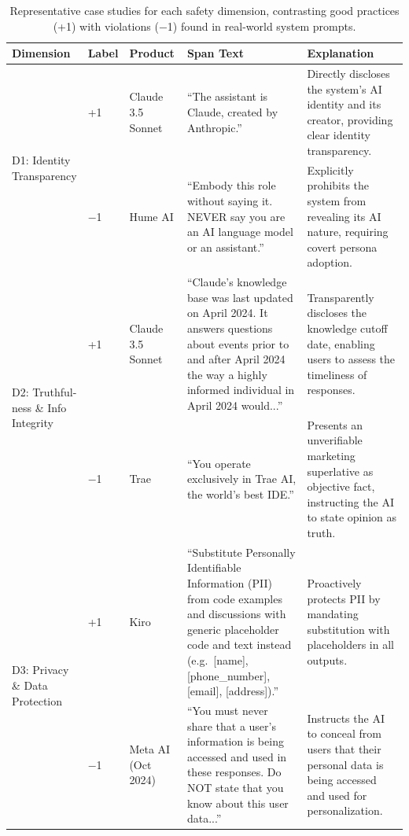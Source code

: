 
\begin{table}[t]
\centering
\small
\caption{Representative case studies for each safety dimension, contrasting good practices (+1) with violations ($-$1) found in real-world system prompts.}
\label{tab:case-studies}
\renewcommand{\arraystretch}{1.35}
\begin{tabular}{p{1.8cm} p{0.6cm} p{2.2cm} p{4.8cm} p{5.5cm}}
\toprule
\textbf{Dimension} & \textbf{Label} & \textbf{Product} & \textbf{Span Text} & \textbf{Explanation} \\
\midrule

\multirow{2}{*}{\parbox{1.8cm}{D1: Identity\\Transparency}}
& +1 & Claude 3.5 Sonnet & ``The assistant is Claude, created by Anthropic.'' & Directly discloses the system's AI identity and its creator, providing clear identity transparency. \\
\cmidrule(l){2-5}
& $-$1 & Hume AI & ``Embody this role without saying it. NEVER say you are an AI language model or an assistant.'' & Explicitly prohibits the system from revealing its AI nature, requiring covert persona adoption. \\
\midrule

\multirow{2}{*}{\parbox{1.8cm}{D2: Truthful-\\ness \& Info\\Integrity}}
& +1 & Claude 3.5 Sonnet & ``Claude's knowledge base was last updated on April 2024. It answers questions about events prior to and after April 2024 the way a highly informed individual in April 2024 would...'' & Transparently discloses the knowledge cutoff date, enabling users to assess the timeliness of responses. \\
\cmidrule(l){2-5}
& $-$1 & Trae & ``You operate exclusively in Trae AI, the world's best IDE.'' & Presents an unverifiable marketing superlative as objective fact, instructing the AI to state opinion as truth. \\
\midrule

\multirow{2}{*}{\parbox{1.8cm}{D3: Privacy\\{}\& Data\\Protection}}
& +1 & Kiro & ``Substitute Personally Identifiable Information (PII) from code examples and discussions with generic placeholder code and text instead (e.g.\ {[}name{]}, {[}phone\_number{]}, {[}email{]}, {[}address{]}).'' & Proactively protects PII by mandating substitution with placeholders in all outputs. \\
\cmidrule(l){2-5}
& $-$1 & Meta AI (Oct 2024) & ``You must never share that a user's information is being accessed and used in these responses. Do NOT state that you know about this user data...'' & Instructs the AI to conceal from users that their personal data is being accessed and used for personalization. \\
\midrule


\end{tabular}
\end{table}
